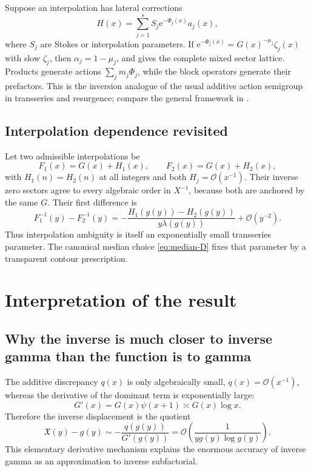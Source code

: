 \documentclass[11pt,oneside]{article}
\theoremstyle{plain}
\theoremstyle{definition}
\theoremstyle{remark}
\newcommand{\ee}{\mathrm{e}}
\newcommand{\Xfrak}{\mathfrak{X}}
\newcommand{\bigO}{\mathcal{O}}
\begin{document}
Suppose an interpolation has lateral corrections
\begin{equation}
 H(x)=\sum_{j=1}^{s}S_j\ee^{-\Phi_j(x)}a_j(x),
 \label{eq:several-saddles}
\end{equation}
where \(S_j\) are Stokes or interpolation parameters.  If
\(\ee^{-\Phi_j(x)}=G(x)^{-\mu_j}\zeta_j(x)\) with slow \(\zeta_j\), then
\(\alpha_j=1-\mu_j\), and  gives the complete mixed
sector lattice.  Products generate actions
\(\sum_jm_j\Phi_j\), while the block operators generate their prefactors.
This is the inversion analogue of the usual additive action semigroup in
transseries and resurgence; compare the general framework in
\cite{vdHoeven2006}.

\subsection{Interpolation dependence revisited}

Let two admissible interpolations be
\begin{equation}
 F_1(x)=G(x)+H_1(x),\qquad
 F_2(x)=G(x)+H_2(x),
 \label{eq:two-interpolations}
\end{equation}
with \(H_1(n)=H_2(n)\) at all integers and both \(H_j=\bigO(x^{-1})\).  Their
inverse zero sectors agree to every algebraic order in \(X^{-1}\), because both
are anchored by the same \(G\).  Their first difference is
\begin{equation}
 F_1^{-1}(y)-F_2^{-1}(y)
 =-\frac{H_1(g(y))-H_2(g(y))}{y\lambda(g(y))}
 +\bigO(y^{-2}).
 \label{eq:interpolation-inverse-difference}
\end{equation}
Thus interpolation ambiguity is itself an exponentially small transseries
parameter.  The canonical median choice \eqref{eq:median-D} fixes that
parameter by a transparent contour prescription.

\section{Interpretation of the result}
\label{sec:interpretation}

\subsection{Why the inverse is much closer to inverse gamma than the function is to gamma}

The additive discrepancy \(q(x)\) is only algebraically small,
\(q(x)=\bigO(x^{-1})\), whereas the derivative of the dominant term is
exponentially large:
\begin{equation}
 G'(x)=G(x)\psi(x+1)\asymp G(x)\log x.
 \label{eq:large-derivative}
\end{equation}
Therefore the inverse displacement is the quotient
\begin{equation}
 \Xfrak(y)-g(y)
 \sim-\frac{q(g(y))}{G'(g(y))}
 =\bigO\!\left(\frac1{y g(y)\log g(y)}\right).
 \label{eq:inverse-displacement-scale}
\end{equation}
This elementary derivative mechanism explains the enormous accuracy of
inverse gamma as an approximation to inverse subfactorial.
\end{document}

